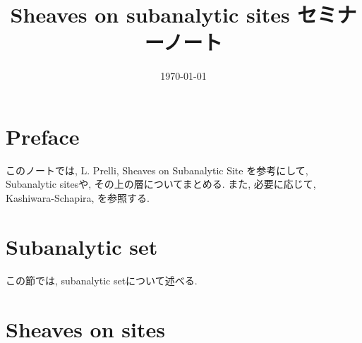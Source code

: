 \documentclass[nomag*,a4paper,leqno]{jsarticle}
\title{\vspace{-2.5em}Sheaves on subanalytic sites セミナーノート\vspace{-1em}}
\date{\vspace{-1em}\today\vspace{-1.5em}}
\numberwithin{thm}{subsection}
\numberwithin{equation}{subsection}
\begin{document}
\maketitle
\tableofcontents
\addtocounter{section}{-1}
\section{Preface}
このノートでは,
L. Prelli,
Sheaves on Subanalytic Site \cite{book:Prelli}
を参考にして,
Subanalytic sitesや,
その上の層についてまとめる.
また, 必要に応じて,
Kashiwara-Schapira\cite{book:KS_sh}, \cite{book:KS_cat}
を参照する.

\section{Subanalytic set}
この節では, subanalytic setについて述べる.


\section{Sheaves on sites}




\end{document}
